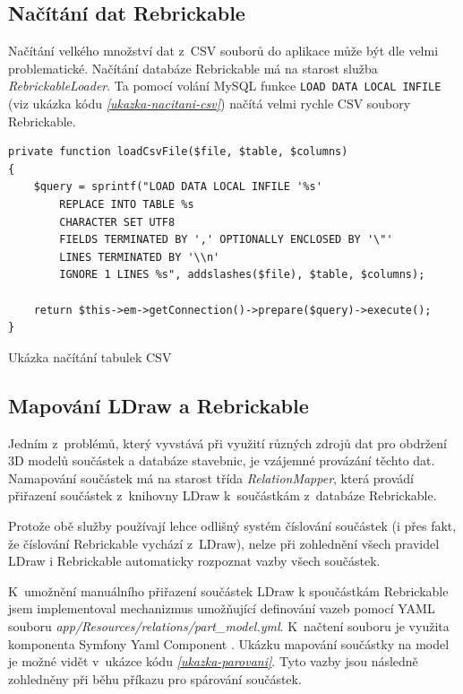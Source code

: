 \subsection{Načítání dat Rebrickable}\label{nacitani-rebrickable}
Načítání velkého množství dat z~CSV souborů do aplikace může být dle \autocite{grok} velmi problematické. Načítání databáze Rebrickable má na starost služba \textit{RebrickableLoader}. Ta pomocí volání MySQL funkce \texttt{LOAD DATA LOCAL INFILE} (viz ukázka kódu \emph{\ref{ukazka-nacitani-csv}}) načítá velmi rychle CSV soubory Rebrickable.

\begin{listing}[htbp]
        \begin{verbatim}
private function loadCsvFile($file, $table, $columns)
{
    $query = sprintf("LOAD DATA LOCAL INFILE '%s' 
        REPLACE INTO TABLE %s
        CHARACTER SET UTF8
        FIELDS TERMINATED BY ',' OPTIONALLY ENCLOSED BY '\"'
        LINES TERMINATED BY '\\n'
        IGNORE 1 LINES %s", addslashes($file), $table, $columns);

    return $this->em->getConnection()->prepare($query)->execute();
}
        \end{verbatim}
    \caption{Ukázka načítání tabulek CSV \label{ukazka-nacitani-csv}}
\end{listing}

\subsection{Mapování LDraw a Rebrickable}
Jedním z~problémů, který vyvstává při využití různých zdrojů dat pro obdržení 3D modelů součástek a databáze stavebnic, je vzájemné provázání těchto dat. Namapování součástek má na starost třída \textit{RelationMapper}, která provádí přiřazení součástek z~knihovny LDraw k~součástkám z~databáze Rebrickable. 

Protože obě služby používají lehce odlišný systém číslování součástek (i přes fakt, že číslování Rebrickable vychází z~LDraw), nelze při zohlednění všech pravidel LDraw \autocite{ldraw:numbering:faq} i Rebrickable \autocite{rebrickable:numbering:changes} automaticky rozpoznat vazby všech součástek.

K~umožnění manuálního přiřazení součástek LDraw k spoučástkám Rebrickable jsem implementoval mechanizmus umožňující definování vazeb pomocí \gls{YAML} souboru \textit{app/Resources/relations/part\_model.yml}. K~načtení souboru je využita komponenta Symfony Yaml Component \autocite{symfony:yaml}. Ukázku mapování součástky na model je možné vidět v~ukázce kódu \emph{\ref{ukazka-parovani}}. Tyto vazby jsou následně zohledněny při běhu příkazu pro spárování součástek.

